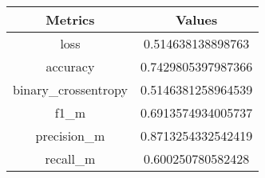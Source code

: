\begin{table}[]
\begin{tabular}{|c|c|}
\hline
\textbf{Metrics} & \textbf{Values}\\\hline
loss & 0.514638138898763 \\ \hline
 accuracy & 0.7429805397987366 \\ \hline
 binary\_crossentropy & 0.5146381258964539 \\ \hline
 f1\_m & 0.6913574934005737 \\ \hline
 precision\_m & 0.8713254332542419 \\ \hline
 recall\_m & 0.600250780582428 \\ \hline
\end{tabular}
\end{table}
